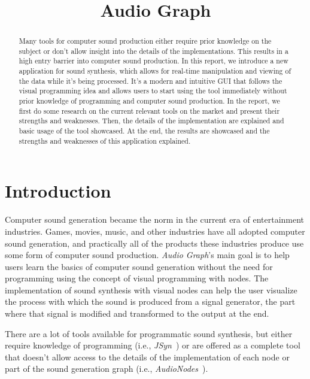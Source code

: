 \documentclass[conference]{IEEEtran}
\begin{document}
\title{Audio Graph}

\maketitle

\begin{abstract}
Many tools for computer sound production either require prior knowledge on the subject or don't allow insight into the details of the implementations. This results in a high entry barrier into computer sound production. In this report, we introduce a new application for sound synthesis, which allows for real-time manipulation and viewing of the data while it's being processed. It's a modern and intuitive GUI that follows the visual programming idea and allows users to start using the tool immediately without prior knowledge of programming and computer sound production. In the report, we first do some research on the current relevant tools on the market and present their strengths and weaknesses. Then, the details of the implementation are explained and basic usage of the tool showcased. At the end, the results are showcased and the strengths and weaknesses of this application explained.
\end{abstract}

\IEEEpeerreviewmaketitle

\section{Introduction}
\label{introduction}
Computer sound generation became the norm in the current era of entertainment industries.
Games, movies, music, and other industries have all adopted computer sound generation, and practically all of the products these industries produce use some form of computer sound production.
\textit{Audio Graph}'s main goal is to help users learn the basics of computer sound generation without the need for programming using the concept of visual programming with nodes. The implementation of sound synthesis with visual nodes can help the user visualize the process with which the sound is produced from a signal generator, the part where that signal is modified and transformed to the output at the end.

There are a lot of tools available for programmatic sound synthesis, but either require knowledge of programming (i.e., \textit{JSyn}~\cite{jsyn}) or are offered as a complete tool that doesn't allow access to the details of the implementation of each node or part of the sound generation graph (i.e., \textit{AudioNodes}~\cite{audionodes}).
\end{document}
